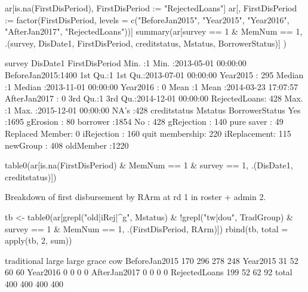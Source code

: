 \begin{Schunk}
\begin{Sinput}
ar[is.na(FirstDisPeriod), FirstDisPeriod := "RejectedLoans"]
ar[, FirstDisPeriod := factor(FirstDisPeriod, levels = 
  c("BeforeJan2015", "Year2015", "Year2016", "AfterJan2017", "RejectedLoans"))]
summary(ar[survey == 1 & MemNum == 1, 
  .(survey, DisDate1, FirstDisPeriod, creditstatus, Mstatus, BorrowerStatus)] )
\end{Sinput}
\begin{Soutput}
     survey     DisDate1                         FirstDisPeriod
 Min.   :1   Min.   :2013-05-01 00:00:00   BeforeJan2015:1400  
 1st Qu.:1   1st Qu.:2013-07-01 00:00:00   Year2015     : 295  
 Median :1   Median :2013-11-01 00:00:00   Year2016     :   0  
 Mean   :1   Mean   :2014-03-23 17:07:57   AfterJan2017 :   0  
 3rd Qu.:1   3rd Qu.:2014-12-01 00:00:00   RejectedLoans: 428  
 Max.   :1   Max.   :2015-12-01 00:00:00                       
             NA's   :428                                       
          creditstatus          Mstatus             BorrowerStatus
 Yes            :1695   gErosion    :  80   borrower       :1854  
 No             : 428   gRejection  : 140   pure saver     :  49  
 Replaced Member:   0   iRejection  : 160   quit membership: 220  
                        iReplacement: 115                         
                        newGroup    : 408                         
                        oldMember   :1220                         
                                                                  
\end{Soutput}
\end{Schunk}
\begin{Schunk}
\begin{Sinput}
table0(ar[is.na(FirstDisPeriod) & MemNum == 1 & survey == 1, .(DisDate1, creditstatus)])
\end{Sinput}
\end{Schunk}
Breakdown of first disbursement by \textsf{RArm} at rd 1 in \textsf{roster + admin} 2.
\begin{Schunk}
\begin{Sinput}
tb <- table0(ar[grepl("old|iRej|^g", Mstatus) 
  & !grepl("tw|dou", TradGroup) & survey == 1 & MemNum == 1,
  .(FirstDisPeriod, RArm)])
rbind(tb, total = apply(tb, 2, sum))
\end{Sinput}
\begin{Soutput}
              traditional large large grace cow
BeforeJan2015         170   296         278 248
Year2015               31    52          60  60
Year2016                0     0           0   0
AfterJan2017            0     0           0   0
RejectedLoans         199    52          62  92
total                 400   400         400 400
\end{Soutput}
\end{Schunk}
